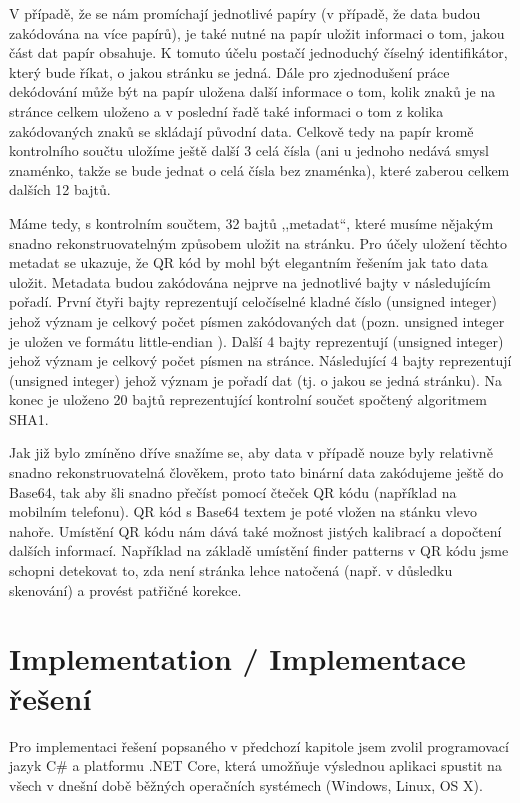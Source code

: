 \documentclass[conference]{IEEEtran}
\begin{document}
V případě, že se nám promíchají jednotlivé papíry (v případě, že data budou zakódována na více papírů), je také nutné na papír uložit informaci o tom, jakou část dat papír obsahuje. K tomuto účelu postačí jednoduchý číselný identifikátor, který bude říkat, o jakou stránku se jedná. Dále pro zjednodušení práce dekódování může být na papír uložena další informace o tom, kolik znaků je na stránce celkem uloženo a v poslední řadě také informaci o tom z kolika zakódovaných znaků se skládají původní data. Celkově tedy na papír kromě kontrolního součtu uložíme ještě další 3 celá čísla (ani u jednoho nedává smysl znaménko, takže se bude jednat o celá čísla bez znaménka), které zaberou celkem dalších 12 bajtů. 

Máme tedy, s kontrolním součtem, 32 bajtů ,,metadat``, které musíme nějakým snadno rekonstruovatelným způsobem uložit na stránku. Pro účely uložení těchto metadat se ukazuje, že QR kód by mohl být elegantním řešením jak tato data uložit. Metadata budou zakódována nejprve na jednotlivé bajty v následujícím pořadí. První čtyři bajty reprezentují celočíselné kladné číslo (unsigned integer) jehož význam je celkový počet písmen zakódovaných dat (pozn. unsigned integer je uložen ve formátu little-endian \cite{IEN137:LittleEndian}). Další 4 bajty reprezentují (unsigned integer) jehož význam je celkový počet písmen na stránce. Následující 4 bajty reprezentují (unsigned integer) jehož význam je pořadí dat (tj. o jakou se jedná stránku). Na konec je uloženo 20 bajtů reprezentující kontrolní součet spočtený algoritmem SHA1. 

Jak již bylo zmíněno dříve snažíme se, aby data v případě nouze byly relativně snadno rekonstruovatelná člověkem, proto tato binární data zakódujeme ještě do Base64, tak aby šli snadno přečíst pomocí čteček QR kódu (například na mobilním telefonu). QR kód s Base64 textem je poté vložen na stánku vlevo nahoře. Umístění QR kódu nám dává také možnost jistých kalibrací a dopočtení dalších informací. Například na základě umístění finder patterns v QR kódu jsme schopni detekovat to, zda není stránka lehce natočená (např. v důsledku skenování) a provést patřičné korekce.

\section{Implementation / Implementace řešení}

Pro implementaci řešení popsaného v předchozí kapitole jsem zvolil programovací jazyk C\# a platformu .NET Core, která umožňuje výslednou aplikaci spustit na všech v dnešní době běžných operačních systémech (Windows, Linux, OS X).
\end{document}
